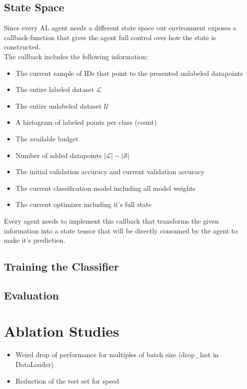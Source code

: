 \documentclass[]{article}
\begin{document}
\subsection{State Space}
Since every AL agent needs a different state space our environment exposes a callback-function that gives the agent full control over how the state is constructed. \\ [1mm]
The callback includes the following information:
\begin{itemize}
	\item The current sample of IDs that point to the presented unlabeled datapoints
	\item The entire labeled dataset $\mathcal{L}$
	\item The entire unlabeled dataset $\mathcal{U}$
	\item A histogram of labeled points per class (count)
	\item The available budget
	\item Number of added datapoints $|\mathcal{L}| - |\mathcal{S}|$
	\item The initial validation accuracy and current validation accuracy
	\item The current classification model including all model weights
	\item The current optimizer including it's full state
\end{itemize}
Every agent needs to implement this callback that transforms the given information into a state tensor that will be directly consumed by the agent to make it's prediction.

\subsection{Training the Classifier}\label{sec:training_the_classifier}
\subsection{Evaluation}\label{sec:evaluation}


\section{Ablation Studies}
\begin{itemize}
	\item Weird drop of performance for multiples of batch size (drop\_last in DataLoader)
	\item Reduction of the test set for speed
\end{itemize}
\end{document}

